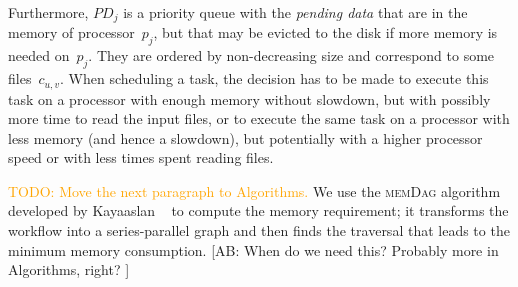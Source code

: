 \documentclass[conference]{IEEEtran}
\newcommand{\algo}[1]{\textsc{#1}}
\newcommand{\PD}{PD}
\newcommand{\AB}[1]{{\color{purple}[AB: #1]}}
\begin{document}
Furthermore, $\PD_j$ is a priority queue with the {\em pending data}
that are in the memory of processor~$p_j$,  but that may be evicted to the disk
if more memory is needed on~$p_j$.
They are ordered by non-decreasing size and correspond to some files~$c_{u,v}$.
When scheduling a task, the decision has to be made to execute this task on a processor with enough memory
without slowdown, but with possibly more time to read the input files, or to execute the same task
on a processor with less memory (and hence a slowdown), but potentially with a higher processor speed 
or with less times spent reading files.


\textcolor{orange}{ TODO: Move the next paragraph to Algorithms.} We use the \algo{memDag} algorithm developed by Kayaaslan \etal~\cite{KAYAASLAN20181} to compute
the memory requirement; it transforms the workflow into a series-parallel graph
and then finds the traversal that leads to the minimum memory consumption.
\AB{When do we need this? Probably more in Algorithms, right? }
\end{document}

